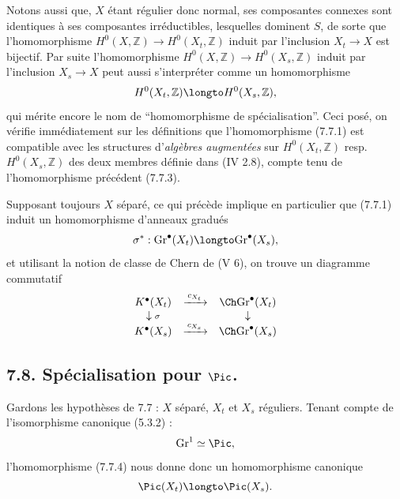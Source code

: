 Notons aussi que, $X$ \'etant r\'egulier donc normal, ses composantes connexes sont identiques \`a ses composantes irr\'eductibles, lesquelles dominent $S$, de sorte que l'homomorphisme $H^{0}(X, \mathbb{Z}) \to H^{0}(X_{t}, \mathbb{Z})$ induit par l'inclusion $X_{t} \to X$ est bijectif. Par suite l'homomorphisme $H^{0}(X, \mathbb{Z}) \to H^{0}(X_{s}, \mathbb{Z})$ induit par l'inclusion $X_{s} \to X$ peut aussi s'interpr\'eter comme un homomorphisme
\begin{equation}\label{eq:7.7.3}
H^{0}(X_{t}, \mathbb{Z}) \longto H^{0}(X_{s}, \mathbb{Z}),
\end{equation}
qui m\'erite encore le nom de ``homomorphisme de sp\'ecialisation''. Ceci pos\'e, on v\'erifie imm\'ediatement sur les d\'efinitions que l'homomorphisme (7.7.1) est compatible avec les structures d'\emph{alg\`ebres augment\'ees} sur $H^{0}(X_{t}, \mathbb{Z})$ resp.\ $H^{0}(X_{s}, \mathbb{Z})$ des deux membres d\'efinie dans (IV 2.8), compte tenu de l'homomorphisme pr\'ec\'edent (7.7.3).

Supposant toujours $X$ s\'epar\'e, ce qui pr\'ec\`ede implique en particulier que (7.7.1) induit un homomorphisme d'anneaux gradu\'es
\begin{equation}\label{eq:7.7.4}
\sigma^{*} : \mathrm{Gr}^{\bullet}(X_{t}) \longto \mathrm{Gr}^{\bullet}(X_{s}),
\end{equation}
et utilisant la notion de classe de Chern de (V 6), on trouve un diagramme commutatif
\[
\begin{array}{ccc}
K^{\bullet}(X_{t}) & \xrightarrow{\,c_{X_{t}}\,} & \Ch \mathrm{Gr}^{\bullet}(X_{t}) \\
\downarrow{\scriptstyle \sigma} & & \downarrow \\
K^{\bullet}(X_{s}) & \xrightarrow{\,c_{X_{s}}\,} & \Ch \mathrm{Gr}^{\bullet}(X_{s})
\end{array}
\]

\subsection*{7.8. Sp\'ecialisation pour $\Pic$.}

Gardons les hypoth\`eses de 7.7 : $X$ s\'epar\'e, $X_{t}$ et $X_{s}$ r\'eguliers. Tenant compte de l'isomorphisme canonique (5.3.2) :
\[
\mathrm{Gr}^{1} \simeq \Pic,
\]
l'homomorphisme (7.7.4) nous donne donc un homomorphisme canonique
\begin{equation}\label{eq:7.8.1}
\Pic(X_{t}) \longto \Pic(X_{s}).
\end{equation}


